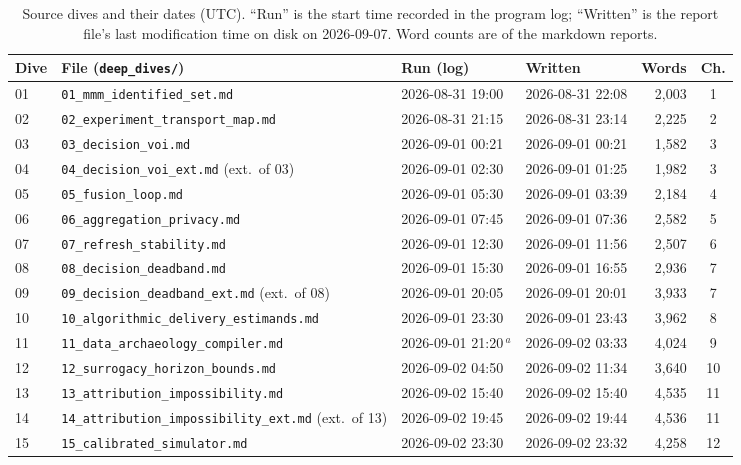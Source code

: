 \begin{table}[htbp]
\centering\small
\caption{Source dives and their dates (UTC). ``Run'' is the start time recorded in the program log; ``Written'' is the report file's last modification time on disk on 2026-09-07. Word counts are of the markdown reports.}
\label{tab:provenance}
\begin{tabular}{@{}l l l l r c@{}}
\toprule
Dive & File (\texttt{deep\_dives/}) & Run (log) & Written & Words & Ch. \\
\midrule
01 & \texttt{01\_mmm\_identified\_set.md} & 2026-08-31 19:00 & 2026-08-31 22:08 & 2{,}003 & 1 \\
02 & \texttt{02\_experiment\_transport\_map.md} & 2026-08-31 21:15 & 2026-08-31 23:14 & 2{,}225 & 2 \\
03 & \texttt{03\_decision\_voi.md} & 2026-09-01 00:21 & 2026-09-01 00:21 & 1{,}582 & 3 \\
04 & \texttt{04\_decision\_voi\_ext.md} (ext.\ of 03) & 2026-09-01 02:30 & 2026-09-01 01:25 & 1{,}982 & 3 \\
05 & \texttt{05\_fusion\_loop.md} & 2026-09-01 05:30 & 2026-09-01 03:39 & 2{,}184 & 4 \\
06 & \texttt{06\_aggregation\_privacy.md} & 2026-09-01 07:45 & 2026-09-01 07:36 & 2{,}582 & 5 \\
07 & \texttt{07\_refresh\_stability.md} & 2026-09-01 12:30 & 2026-09-01 11:56 & 2{,}507 & 6 \\
08 & \texttt{08\_decision\_deadband.md} & 2026-09-01 15:30 & 2026-09-01 16:55 & 2{,}936 & 7 \\
09 & \texttt{09\_decision\_deadband\_ext.md} (ext.\ of 08) & 2026-09-01 20:05 & 2026-09-01 20:01 & 3{,}933 & 7 \\
10 & \texttt{10\_algorithmic\_delivery\_estimands.md} & 2026-09-01 23:30 & 2026-09-01 23:43 & 3{,}962 & 8 \\
11 & \texttt{11\_data\_archaeology\_compiler.md} & 2026-09-01 21:20\,$^{a}$ & 2026-09-02 03:33 & 4{,}024 & 9 \\
12 & \texttt{12\_surrogacy\_horizon\_bounds.md} & 2026-09-02 04:50 & 2026-09-02 11:34 & 3{,}640 & 10 \\
13 & \texttt{13\_attribution\_impossibility.md} & 2026-09-02 15:40 & 2026-09-02 15:40 & 4{,}535 & 11 \\
14 & \texttt{14\_attribution\_impossibility\_ext.md} (ext.\ of 13) & 2026-09-02 19:45 & 2026-09-02 19:44 & 4{,}536 & 11 \\
15 & \texttt{15\_calibrated\_simulator.md} & 2026-09-02 23:30 & 2026-09-02 23:32 & 4{,}258 & 12 \\

\end{tabular}
\end{table}
